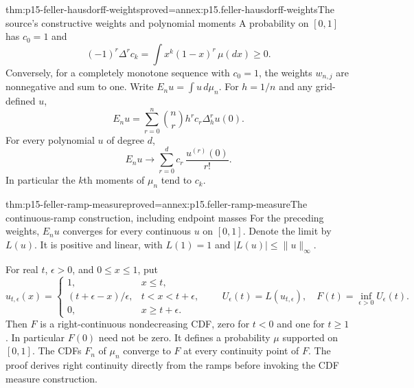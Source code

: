 \begin{hbtheorem}{thm:p15-feller-hausdorff-weights}{proved=annex:p15.feller-hausdorff-weights}{The source's constructive weights and polynomial moments}
A probability on \([0,1]\) has \(c_0=1\) and
\[
                      (-1)^r\Delta^r c_k
                         =\int x^k(1-x)^r\,\mu(dx)\geq0.
\]
Conversely, for a completely monotone sequence with \(c_0=1\),
the weights \(w_{n,j}\) are nonnegative and sum to one.
Write \(E_nu=\int u\,d\mu_n\).
For \(h=1/n\) and any grid-defined \(u\),
\[
                 E_nu=\sum_{r=0}^n\binom nr h^r c_r\Delta_h^ru(0).
\]
For every polynomial \(u\) of degree \(d\),
\[
                 E_nu\longrightarrow
                   \sum_{r=0}^d c_r\,\frac{u^{(r)}(0)}{r!}.
\]
In particular the \(k\)th moments of \(\mu_n\) tend to \(c_k\).
\end{hbtheorem}

\begin{hbtheorem}{thm:p15-feller-ramp-measure}{proved=annex:p15.feller-ramp-measure}{The continuous-ramp construction, including endpoint masses}
For the preceding weights, \(E_nu\) converges for every continuous
\(u\) on \([0,1]\). Denote the limit by \(L(u)\).
It is positive and linear, with \(L(1)=1\) and
\(|L(u)|\leq\|u\|_\infty\).

For real \(t\), \(\epsilon>0\), and \(0\leq x\leq1\), put
\[
 u_{t,\epsilon}(x)=
 \begin{cases}
 1,&x\leq t,\\
 (t+\epsilon-x)/\epsilon,&t<x<t+\epsilon,\\
 0,&x\geq t+\epsilon.
 \end{cases}
 \qquad
 U_\epsilon(t)=L(u_{t,\epsilon}),\quad
 F(t)=\inf_{\epsilon>0}U_\epsilon(t).
\]
Then \(F\) is a right-continuous nondecreasing CDF, zero for \(t<0\)
and one for \(t\geq1\). In particular \(F(0)\) need not be zero.
It defines a probability \(\mu\) supported on \([0,1]\).
The CDFs \(F_n\) of \(\mu_n\) converge to \(F\) at every
continuity point of \(F\). The proof derives right continuity directly
from the ramps before invoking the CDF measure construction.
\end{hbtheorem}

